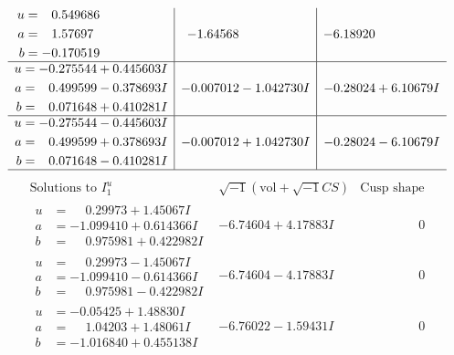 \documentclass[1p]{elsarticle_modified}
\theoremstyle{definition}
\newcommand{\I}{\sqrt{-1}}
\begin{document}
$$\begin{array}{c|c|c}
\begin{aligned}
u &= \phantom{-}0.549686\phantom{ +0.000000I} \\
a &= \phantom{-}1.57697\phantom{ +0.000000I} \\
b &= -0.170519\phantom{ +0.000000I}\end{aligned}
 & -1.64568\phantom{ +0.000000I} & -6.18920\phantom{ +0.000000I} \\ \hline\begin{aligned}
u &= -0.275544 + 0.445603 I \\
a &= \phantom{-}0.499599 - 0.378693 I \\
b &= \phantom{-}0.071648 + 0.410281 I\end{aligned}
 & -0.007012 - 1.042730 I & -0.28024 + 6.10679 I \\ \hline\begin{aligned}
u &= -0.275544 - 0.445603 I \\
a &= \phantom{-}0.499599 + 0.378693 I \\
b &= \phantom{-}0.071648 - 0.410281 I\end{aligned}
 & -0.007012 + 1.042730 I & -0.28024 - 6.10679 I\\
 \hline 
 \end{array}$$\newpage$$\begin{array}{c|c|c}  
\text{Solutions to }I^u_{1}& \I (\text{vol} + \sqrt{-1}CS) & \text{Cusp shape}\\
 \hline 
\begin{aligned}
u &= \phantom{-}0.29973 + 1.45067 I \\
a &= -1.099410 + 0.614366 I \\
b &= \phantom{-}0.975981 + 0.422982 I\end{aligned}
 & -6.74604 + 4.17883 I & \phantom{-0.000000 } 0 \\ \hline\begin{aligned}
u &= \phantom{-}0.29973 - 1.45067 I \\
a &= -1.099410 - 0.614366 I \\
b &= \phantom{-}0.975981 - 0.422982 I\end{aligned}
 & -6.74604 - 4.17883 I & \phantom{-0.000000 } 0 \\ \hline\begin{aligned}
u &= -0.05425 + 1.48830 I \\
a &= \phantom{-}1.04203 + 1.48061 I \\
b &= -1.016840 + 0.455138 I\end{aligned}
 & -6.76022 - 1.59431 I & \phantom{-0.000000 } 0 \\ \hline\begin{aligned}

\end{aligned}
\end{array}$$
\end{document}
